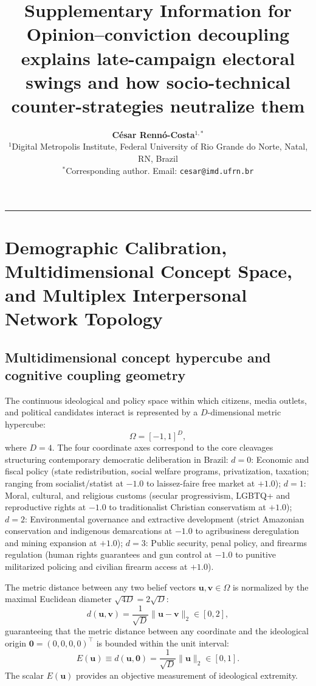 \documentclass[11pt,a4paper]{article}
\title{\textbf{\Large Supplementary Information for \\ Opinion–conviction decoupling explains late-campaign electoral swings and how socio-technical counter-strategies neutralize them}}
\author{
    \textbf{César Rennó-Costa}$^{1,*}$ \\[0.8em]
    $^{1}$Digital Metropolis Institute, Federal University of Rio Grande do Norte, Natal, RN, Brazil \\
    $^{*}$Corresponding author. Email: \texttt{cesar@imd.ufrn.br}
}
\date{}
\begin{document}
\maketitle

\tableofcontents
\vspace{1.5em}
\hrule
\vspace{1.5em}

\section{Demographic Calibration, Multidimensional Concept Space, and Multiplex Interpersonal Network Topology}
\label{snote:demographics_concept_multiplex}

\subsection{Multidimensional concept hypercube and cognitive coupling geometry}
\label{sssec:concept_space_math}
The continuous ideological and policy space within which citizens, media outlets, and political candidates interact is represented by a $D$-dimensional metric hypercube:
\begin{equation}
    \Omega = [-1, 1]^D,
    \label{eq:concept_hypercube}
\end{equation}
where $D = 4$. The four coordinate axes correspond to the core cleavages structuring contemporary democratic deliberation in Brazil:
$d = 0$: Economic and fiscal policy (state redistribution, social welfare programs, privatization, taxation; ranging from socialist/statist at $-1.0$ to laissez-faire free market at $+1.0$);
$d = 1$: Moral, cultural, and religious customs (secular progressivism, LGBTQ+ and reproductive rights at $-1.0$ to traditionalist Christian conservatism at $+1.0$);
$d = 2$: Environmental governance and extractive development (strict Amazonian conservation and indigenous demarcations at $-1.0$ to agribusiness deregulation and mining expansion at $+1.0$);
$d = 3$: Public security, penal policy, and firearms regulation (human rights guarantees and gun control at $-1.0$ to punitive militarized policing and civilian firearm access at $+1.0$).

The metric distance between any two belief vectors $\mathbf{u}, \mathbf{v} \in \Omega$ is normalized by the maximal Euclidean diameter $\sqrt{4D} = 2\sqrt{D}$:
\begin{equation}
    d(\mathbf{u}, \mathbf{v}) = \frac{1}{\sqrt{D}} \|\mathbf{u} - \mathbf{v}\|_2 \in [0, 2],
    \label{eq:metric_distance}
\end{equation}
guaranteeing that the metric distance between any coordinate and the ideological origin $\mathbf{0} = (0, 0, 0, 0)^{\top}$ is bounded within the unit interval:
\begin{equation}
    E(\mathbf{u}) \equiv d(\mathbf{u}, \mathbf{0}) = \frac{1}{\sqrt{D}} \|\mathbf{u}\|_2 \in [0, 1].
    \label{eq:extremity_metric}
\end{equation}
The scalar $E(\mathbf{u})$ provides an objective measurement of ideological extremity.
\end{document}
